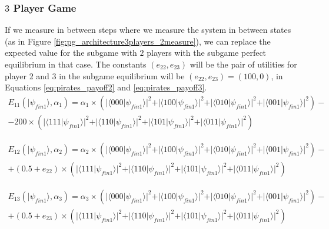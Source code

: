 \subsubsection{$3$ Player Game}
\label{subsubsec:3playergame}





If we measure in between steps where we measure the system in between states (as in Figure \ref{fig:pg_architecture3players_2measure}), we can replace the expected value for the subgame with $2$ players with the subgame perfect equilibrium in that case. The constants $(e_{22}, e_{23})$ will be the pair of utilities for player 2 and 3 in the subgame equilibrium will be $(e_{22}, e_{23})=(100, 0)$, in Equations \ref{eq:pirates_payoff2} and \ref{eq:pirates_payoff3}.  
 \begin{equation}
\begin{split}
E_{11}(\vert\psi_{fin1}\rangle, \alpha_{1})=\alpha_{1}\times(\vert\langle000\vert\psi_{fin1}\rangle\vert^{2} + \vert\langle100\vert\psi_{fin1}\rangle\vert^{2}
+ \vert\langle010\vert\psi_{fin1}\rangle\vert^{2}
+ \vert\langle001\vert\psi_{fin1}\rangle\vert^{2}
 ) - \\
 - 200\times(\vert\langle111\vert\psi_{fin1}\rangle\vert^{2} + \vert\langle110\vert\psi_{fin1}\rangle\vert^{2}
+ \vert\langle101\vert\psi_{fin1}\rangle\vert^{2}
+ \vert\langle011\vert\psi_{fin1}\rangle\vert^{2}
 )
\end{split}
\end{equation}

 \begin{equation}
\begin{split}
E_{12}(\vert\psi_{fin1}\rangle, \alpha_{2})=\alpha_{2}\times(\vert\langle000\vert\psi_{fin1}\rangle\vert^{2} + \vert\langle100\vert\psi_{fin1}\rangle\vert^{2}
+ \vert\langle010\vert\psi_{fin1}\rangle\vert^{2}
+ \vert\langle001\vert\psi_{fin1}\rangle\vert^{2}
 ) - \\
 + (0.5 + e_{22})\times(\vert\langle111\vert\psi_{fin1}\rangle\vert^{2} + \vert\langle110\vert\psi_{fin1}\rangle\vert^{2}
+ \vert\langle101\vert\psi_{fin1}\rangle\vert^{2}
+ \vert\langle011\vert\psi_{fin1}\rangle\vert^{2}
 )
\end{split}
\label{eq:pirates_payoff2}
\end{equation}

 \begin{equation}
\begin{split}
E_{13}(\vert\psi_{fin1}\rangle, \alpha_{3})=\alpha_{3}\times(\vert\langle000\vert\psi_{fin1}\rangle\vert^{2} + \vert\langle100\vert\psi_{fin1}\rangle\vert^{2}
+ \vert\langle010\vert\psi_{fin1}\rangle\vert^{2}
+ \vert\langle001\vert\psi_{fin1}\rangle\vert^{2}
 ) - \\
 + (0.5 + e_{23})\times(\vert\langle111\vert\psi_{fin1}\rangle\vert^{2} + \vert\langle110\vert\psi_{fin1}\rangle\vert^{2}
+ \vert\langle101\vert\psi_{fin1}\rangle\vert^{2}
+ \vert\langle011\vert\psi_{fin1}\rangle\vert^{2}
 )
\end{split}
\label{eq:pirates_payoff3}
\end{equation}

